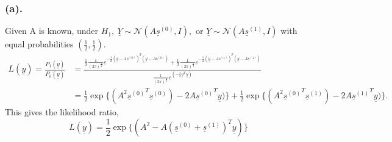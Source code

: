 \documentclass[a4paper,english,12pt]{article}
\begin{document}
\subsubsection*{(a).}
Given A is known, under $H_1,~\underline{Y}\sim\mathcal{N}(A\underline{s}^{(0)},I),$ or $\underline{Y}\sim\mathcal{N}(A\underline{s}^{(1)},I)$ with equal probabilities $(\frac{1}{2},\frac{1}{2})$.
\begin{align*}
L(\underline{y})=\frac{P_1\left(\underline{y}\right)}{P_0\left(\underline{y}\right)}&=\frac{\frac{1}{2}\frac{1}{(2\pi)^{\frac{n}{2}}}e^{-\frac{1}{2}\left(\underline{y}-A \underline{s}^{(0)} \right)^T \left(\underline{y}-A \underline{s}^{(0)} \right)} +\frac{1}{2}\frac{1}{(2\pi)^{\frac{n}{2}}}e^{-\frac{1}{2}\left(\underline{y}-A \underline{s}^{(1)} \right)^T \left(\underline{y}-A \underline{s}^{(1)} \right)} }{\frac{1}{(2\pi)^{\frac{n}{2}}} e^{(-\frac{1}{2}\underline{y}^T \,\underline{y})}}\\
&=\frac{1}{2}\exp\{(A^2 {\underline{s}^{(0)}}^T \underline{s}^{(0)})- 2 A {\underline{s}^{(0)}}^T \underline{y})\} + \frac{1}{2}\exp\{(A^2 {\underline{s}^{(0)}}^T \underline{s}^{(1)})- 2 A {\underline{s}^{(1)}}^T \underline{y})\}.
\end{align*}
This gives the likelihood ratio,
\begin{equation*}
L(\underline{y})=\frac{1}{2} \exp\{\left({A^2}- A (\underline{s}^{(0)}+\underline{s}^{(1)})^T \underline{y}\right)\}
\end{equation*}
\end{document}
